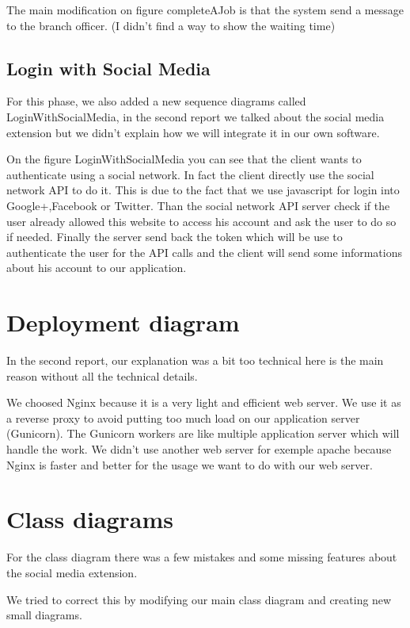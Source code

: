 \documentclass[11pt, a4paper]{article}   	%
\begin{document}
The main modification on figure {completeAJob} is that the system send a message to the branch officer. (I didn't find a way to show the waiting time)

\subsection{Login with Social Media}

For this phase, we also added a new sequence diagrams called LoginWithSocialMedia, in the second report we talked about the social media extension but we didn't explain how we will integrate it in our own software.


On the figure {LoginWithSocialMedia} you can see that the client wants to authenticate using a social network. In fact the client directly use the social network API to do it. This is due to the fact that we use javascript for login into Google+,Facebook or Twitter. Than the social network API server check if the user already allowed this website to access his account and ask the user to do so if needed. 
Finally the server send back the token which will be use to authenticate the user for the API calls and the client will send some informations about his account to our application.

\section{Deployment diagram}

In the second report, our explanation was a bit too technical here is the main reason without all the technical details.

We choosed Nginx because it is a very light and efficient web server. We use it as a reverse proxy to avoid putting too much load on our application server (Gunicorn). The Gunicorn workers are like multiple application server which will handle the work. We didn't use another web server for exemple apache because Nginx is faster and better for the usage we want to do with our web server.

\section{Class diagrams}

For the class diagram there was a few mistakes and some missing features about the social media extension. 

We tried to correct this by modifying our main class diagram and creating new small diagrams.
\end{document}
